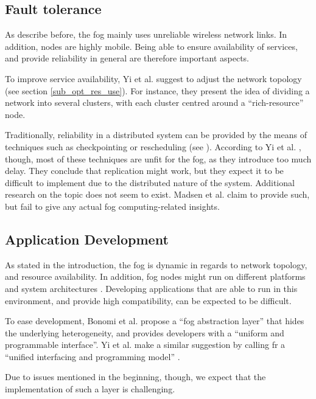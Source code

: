 \documentclass{article}
\begin{document}
\subsection{Fault tolerance}
As describe before, the fog mainly uses unreliable wireless network links. In addition, nodes are highly mobile. Being able to ensure availability of services, and provide reliability in general are therefore important aspects.

To improve service availability, Yi et al. \cite{yi2015survey} suggest to adjust the network topology (see section \ref{sub_opt_res_use}). For instance, they present the idea of dividing a network into several clusters, with each cluster centred around a ``rich-resource'' node.

Traditionally, reliability in a distributed system can be provided by the means of techniques such as checkpointing or rescheduling (see \cite{tanebaum2013}). According to Yi et al. \cite{yi2015survey}, though, most of these techniques are unfit for the fog, as they introduce too much delay. They conclude that replication might work, but they expect it to be difficult to implement due to the distributed nature of the system. Additional research on the topic does not seem to exist. Madsen et al. \cite{madsen2013reliability} claim to provide such, but fail to give any actual fog computing-related insights.



\subsection{Application Development}
As stated in the introduction, the fog is dynamic in regards to network topology, and resource availability. In addition, fog nodes might run on different platforms and system architectures \cite{yi2015survey}. Developing applications that are able to run in this environment, and provide high compatibility, can be expected to be difficult. 

To ease development, Bonomi et al. \cite{bonomi2014fog} propose a ``fog abstraction layer'' that hides the underlying heterogeneity, and provides developers with a ``uniform and programmable interface''. Yi et al. make a similar suggestion by calling fr a ``unified interfacing and programming model'' \cite{yi2015survey}.

Due to issues mentioned in the beginning, though, we expect that the implementation of such a layer is challenging.
\end{document}
